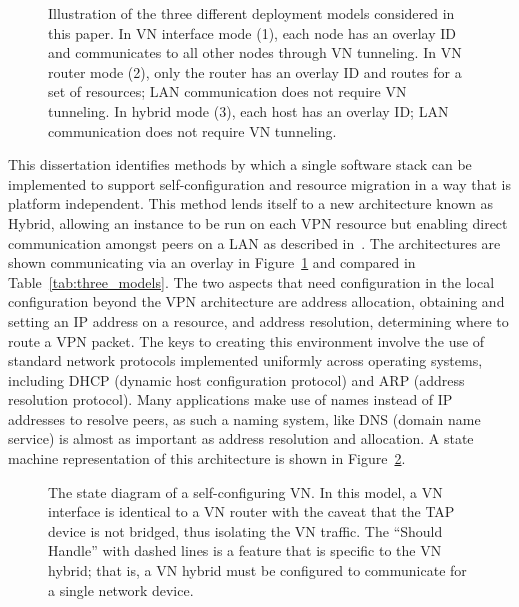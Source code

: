 \begin{figure}
\centering
{}
\caption[Three VN Approaches]{Illustration of the three different deployment
models considered in this paper. In VN interface mode (1), each node has an
overlay ID and communicates to all other nodes through VN tunneling. In VN
router mode (2), only the router has an overlay ID and routes for a set of
resources; LAN communication does not require VN tunneling. In hybrid mode
(3), each host has an overlay ID; LAN communication does not require VN
tunneling.}
\label{fig:three_models}
\end{figure}

This dissertation identifies methods by which a single software stack can be
implemented to support self-configuration and resource migration in a way that
is platform independent.  This method lends itself to a new architecture known
as Hybrid, allowing an instance to be run on each VPN resource but enabling
direct communication amongst peers on a LAN as described in~\cite{sc09}.  The
architectures are shown communicating via an overlay in
Figure~\ref{fig:three_models} and compared in Table~\ref{tab:three_models}.
The two aspects that need configuration in the local configuration beyond the
VPN architecture are address allocation, obtaining and setting an IP address on
a resource, and address resolution, determining where to route a VPN packet.
The keys to creating this environment involve the use of standard network
protocols implemented uniformly across operating systems, including DHCP
(dynamic host configuration protocol) and ARP (address resolution protocol).
Many applications make use of names instead of IP addresses to resolve peers,
as such a naming system, like DNS (domain name service) is almost as important
as address resolution and allocation.  A state machine representation of this
architecture is shown in Figure~\ref{fig:vn}.

\begin{figure}[ht]
\centering
{}
\caption[The state diagram of a self-configuring VN.]{The state diagram of a
self-configuring VN.  In this model, a VN interface is identical to a VN router
with the caveat that the TAP device is not bridged, thus isolating the VN
traffic.  The ``Should Handle'' with dashed lines is a feature that is specific
to the VN hybrid; that is, a VN hybrid must be configured to communicate for a
single network device.}
\label{fig:vn}
\end{figure}

